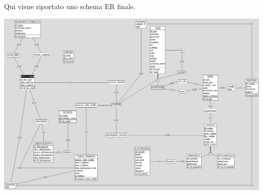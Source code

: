 Qui viene riportato uno schema ER finale.

\begin{center}
\centerline{\includegraphics[width=0.9\paperwidth]{images/schema_ER_finale.png}}
\end{center}
